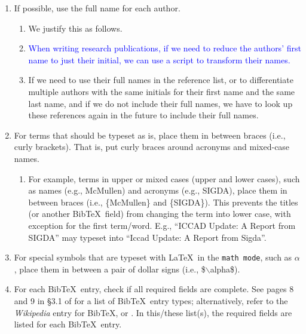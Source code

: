 \documentclass[letter,12pt]{article}
\begin{document}
\begin{enumerate}
\begin{enumerate}
\begin{enumerate}
\begin{enumerate}
			\item TrentoSMTmembers20XY
			\item Author = \{\{[Name-of-Organization] contributors\}\},
			\item NameOfOrganizationContributors20XY
			\item CIAOcontributors20XY
			\item TrentoSMTcontributors20XY
			\end{enumerate}
		\end{enumerate} 
	\end{enumerate}
\item If possible, use the full name for each author. \vspace{-0.3cm}
	\begin{enumerate} \itemsep -2pt
	\item We justify this as follows.
	\item \textcolor{blue}{When writing research publications, if we need to reduce the authors' first name to just their initial, we can use a script to transform their names.}
	\item If we need to use their full names in the reference list, or to differentiate multiple authors with the same initials for their first name and the same last name, and if we do not include their full names, we have to look up these references again in the future to include their full names.
	\end{enumerate}
\item For terms that should be typeset as is, place them in between braces (i.e., curly brackets). That is, put curly braces around acronyms and mixed-case names. \vspace{-0.3cm}
	\begin{enumerate} \itemsep -2pt
	\item For example, terms in upper or mixed cases (upper and lower cases), such as names (e.g., McMullen) and acronyms (e.g., SIGDA), place them in between braces (i.e., \{McMullen\} and \{SIGDA\}). This prevents the titles (or another {\sc Bib}\TeX\ field) from changing the term into lower case, with exception for the first term/word. E.g., ``ICCAD Update: A Report from SIGDA'' may typeset into ``Iccad Update: A Report from Sigda''.
	\end{enumerate}
\item For special symbols that are typeset with \LaTeX\ in the {\tt math mode}, such as $\alpha$, place them in between a pair of dollar signs (i.e., \$$\backslash$alpha\$).
\item For each {\sc Bib}\TeX\ entry, check if all required fields are complete. See pages 8 and 9 in \S3.1 of \cite{Patashnik1988} for a list of {\sc Bib}\TeX\ entry types; alternatively, refer to the {\it Wikipedia} entry for {\sc Bib}\TeX, or \cite[\S12.2.1, pp. 230--231]{Kopka2004}. In this/these list(s), the required fields are listed for each {\sc Bib}\TeX\ entry.

\end{enumerate}
\end{document}
